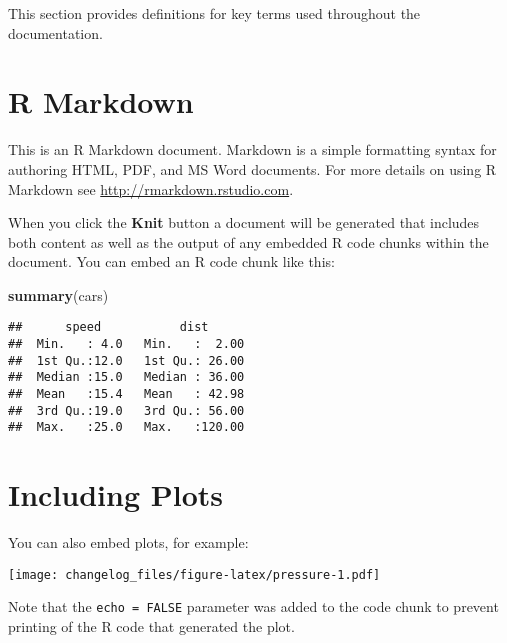 \documentclass[
]{book}
\newenvironment{Shaded}{\begin{snugshade}}{\end{snugshade}}
\newcommand{\FunctionTok}[1]{\textcolor[rgb]{0.13,0.29,0.53}{\textbf{#1}}}
\newcommand{\NormalTok}[1]{#1}
\begin{document}
This section provides definitions for key terms used throughout the documentation.

\hypertarget{r-markdown}{%
\section{R Markdown}\label{r-markdown}}

This is an R Markdown document. Markdown is a simple formatting syntax for authoring HTML, PDF, and MS Word documents. For more details on using R Markdown see \url{http://rmarkdown.rstudio.com}.

When you click the \textbf{Knit} button a document will be generated that includes both content as well as the output of any embedded R code chunks within the document. You can embed an R code chunk like this:

\begin{Shaded}
\begin{Highlighting}[]
\FunctionTok{summary}\NormalTok{(cars)}
\end{Highlighting}
\end{Shaded}

\begin{verbatim}
##      speed           dist       
##  Min.   : 4.0   Min.   :  2.00  
##  1st Qu.:12.0   1st Qu.: 26.00  
##  Median :15.0   Median : 36.00  
##  Mean   :15.4   Mean   : 42.98  
##  3rd Qu.:19.0   3rd Qu.: 56.00  
##  Max.   :25.0   Max.   :120.00
\end{verbatim}

\hypertarget{including-plots}{%
\section{Including Plots}\label{including-plots}}

You can also embed plots, for example:

\texttt{[image: changelog\_files/figure-latex/pressure-1.pdf]}

Note that the \texttt{echo\ =\ FALSE} parameter was added to the code chunk to prevent printing of the R code that generated the plot.

  
\end{document}
